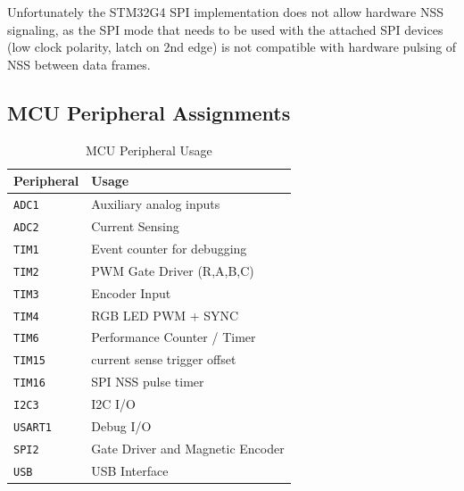 \documentclass[12pt,a4paper,oneside,openany]{article}
\begin{document}
Unfortunately the STM32G4 SPI implementation does not allow hardware NSS signaling, as the SPI mode that needs to be used with the attached SPI devices (low clock polarity, latch on 2nd edge) is not compatible with hardware pulsing of NSS between data frames.

\subsection{MCU Peripheral Assignments}

\begin{table}[htbp]
\caption{MCU Peripheral Usage}
\begin{center}
\begin{tabular}{ll} \toprule
 Peripheral & Usage \\
\midrule \texttt{ADC1} & Auxiliary analog inputs \\
\texttt{ADC2} & Current Sensing \\
\midrule
\texttt{TIM1} & Event counter for debugging \\
\texttt{TIM2} & PWM Gate Driver (R,A,B,C) \\
\texttt{TIM3} & Encoder Input \\
\texttt{TIM4} & RGB LED PWM + SYNC\\
\texttt{TIM6} & Performance Counter / Timer \\
\texttt{TIM15} & current sense trigger offset \\
\texttt{TIM16} & SPI NSS pulse timer \\
\midrule
\texttt{I2C3} & I2C I/O \\
\texttt{USART1} & Debug I/O \\ 
\texttt{SPI2} & Gate Driver and Magnetic Encoder \\
\texttt{USB} & USB Interface \\
\bottomrule
\end{tabular}
\end{center}
\label{tab:mcu-peripherals}
\end{table}%
\end{document}

